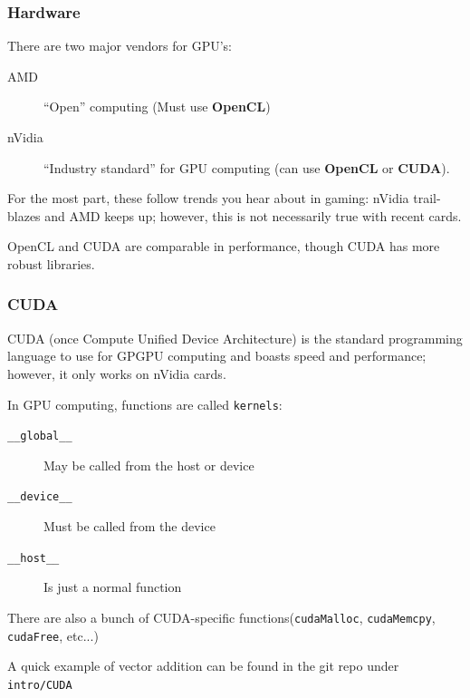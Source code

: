 \documentclass{beamer}
\begin{document}
\begin{frame}
\frametitle{Hardware}
There are two major vendors for GPU's: 
\begin{description}
\item[AMD] ``Open'' computing (Must use \textbf{OpenCL})
\item[nVidia] ``Industry standard'' for GPU computing (can use \textbf{OpenCL} or \textbf{CUDA}). 
\end{description}

For the most part, these follow trends you hear about in gaming: nVidia trail-blazes and AMD keeps up; however, this is not necessarily true with recent cards.

\vspace{0.5cm}

OpenCL and CUDA are comparable in performance, though CUDA has more robust libraries.
\end{frame}

\begin{frame}
\frametitle{CUDA}
\vspace{-0.5cm}

CUDA (once Compute Unified Device Architecture) is the standard programming language to use for GPGPU computing and boasts speed and performance; however, it only works on nVidia cards.

\vspace{0.5cm}
In GPU computing, functions are called \texttt{kernels}:
\begin{description}
\item [\texttt{\_\_global\_\_}] May be called from the host or device
\item [\texttt{\_\_device\_\_}] Must be called from the device
\item [\texttt{\_\_host\_\_}] Is just a normal function
\end{description}

There are also a bunch of CUDA-specific functions(\texttt{cudaMalloc}, \texttt{cudaMemcpy}, \texttt{cudaFree}, etc...)

\vspace{0.5cm}
A quick example of vector addition can be found in the git repo under \texttt{intro/CUDA}

\end{frame}
\end{document}
